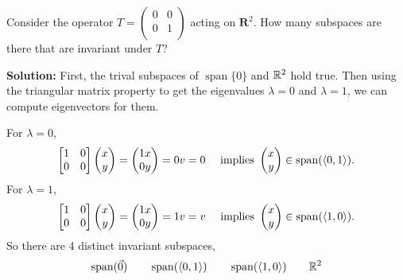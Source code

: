 Consider the operator
$T = \left(
        \begin{array}{cc}
          0 & 0  \\
          0 & 1 \\
        \end{array}
      \right)$
acting on $\mathbf{R}^2$.  How many subspaces are there that are invariant under $T$?
\begin{mybox}
  \textbf{Solution: } First, the trival subspaces of $\operatorname{span}\{0\}$ and $\mathbb{R}^2$ hold true. Then using the triangular matrix property to get the eigenvalues $\lambda = 0$ and $\lambda = 1$, we can compute eigenvectors for them. 

  \nl For $\lambda = 0$, 
  $$\begin{bmatrix}{1} & {0}\\{0}&{0}\end{bmatrix} \begin{pmatrix}{x}\\{y}\end{pmatrix} =  \begin{pmatrix}{1x}\\{0y}\end{pmatrix} = 0v = 0 \quad \text{ implies }  \begin{pmatrix}{x}\\{y}\end{pmatrix} \in \operatorname{span}(\left\langle{0,1}\right\rangle).$$
  For $\lambda = 1$, 
  $$\begin{bmatrix}{1} & {0}\\{0}&{0}\end{bmatrix} \begin{pmatrix}{x}\\{y}\end{pmatrix} = \begin{pmatrix}{1x}\\{0y}\end{pmatrix} = 1v = v \quad \text{ implies }  \begin{pmatrix}{x}\\{y}\end{pmatrix} \in \operatorname{span}(\left\langle{1,0}\right\rangle).$$
  So there are 4 distinct invariant subspaces,
  $$\operatorname{span}(\vec{0}) \qquad \operatorname{span}(\left\langle{0,1}\right\rangle) \qquad \operatorname{span}(\left\langle{1,0}\right\rangle) \qquad \mathbb{R}^2$$
\end{mybox}